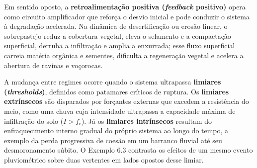 Em sentido oposto, a \textbf{retroalimentação positiva (\textit{feedback} positivo)} opera como circuito amplificador que reforça o desvio inicial e pode conduzir o sistema à degradação acelerada. Na dinâmica de desertificação ou erosão linear, o sobrepastejo reduz a cobertura vegetal, eleva o selamento e a compactação superficial, derruba a infiltração e amplia a enxurrada; esse fluxo superficial carreia matéria orgânica e sementes, dificulta a regeneração vegetal e acelera a abertura de ravinas e voçorocas.

A mudança entre regimes ocorre quando o sistema ultrapassa \textbf{limiares (\textit{thresholds})}, definidos como patamares críticos de ruptura. Os \textbf{limiares extrínsecos} são disparados por forçantes externas que excedem a resistência do meio, como uma chuva cuja intensidade ultrapassa a capacidade máxima de infiltração do solo ($I > f_c$). Já os \textbf{limiares intrínsecos} resultam do enfraquecimento interno gradual do próprio sistema ao longo do tempo, a exemplo da perda progressiva de coesão em um barranco fluvial até seu desmoronamento súbito. O Exemplo 6.3 contrasta os efeitos de um mesmo evento pluviométrico sobre duas vertentes em lados opostos desse limiar.

